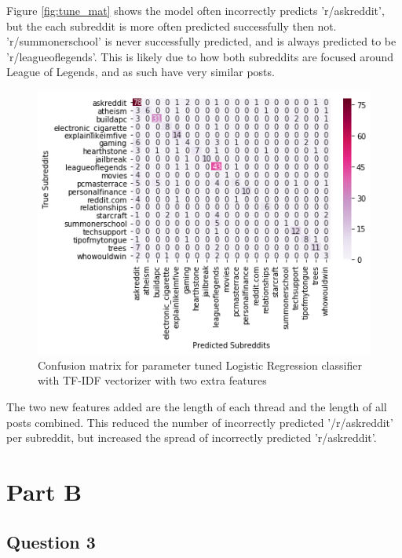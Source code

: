 \documentclass[10pt, a4paper]{article}
\begin{document}
Figure \ref{fig:tune_mat} shows the model often incorrectly predicts 'r/askreddit', but the each subreddit is more often
predicted successfully then not.
'r/summonerschool' is never successfully predicted, and is always predicted to be 'r/leagueoflegends'.
This is likely due to how both subreddits are focused around League of Legends, and as such have very similar posts.

\begin{figure}[H]
	\caption{Confusion matrix for parameter tuned Logistic Regression classifier with TF-IDF vectorizer with two extra features}
	\begin{center}
		\includegraphics[width=.6\linewidth]{q2_mat_final}
	\end{center}
\end{figure}

The two new features added are the length of each thread and the length of all posts combined.
This reduced the number of incorrectly predicted '/r/askreddit' per subreddit, but increased the spread of incorrectly predicted
'r/askreddit'.

\section{Part B}
\subsection{Question 3}
\end{document}
